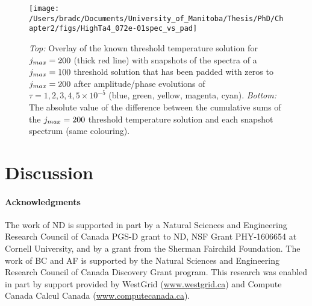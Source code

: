 \documentclass[../PhD.tex]{subfiles}
\begin{document}
\begin{figure}[ht]
	\centering
	\texttt{[image: /Users/bradc/Documents/University\_of\_Manitoba/Thesis/PhD/Chapter2/figs/HighTa4\_072e-01spec\_vs\_pad]}
	\caption{{\it Top:} Overlay of the known threshold temperature solution for $j_{max} = 200$ (thick red line) with snapshots of the spectra of a $j_{max} = 100$ threshold solution that has been padded with zeros to $j_{max} = 200$ after amplitude/phase evolutions of $\tau =1, 2, 3, 4, 5 \times 10^{-5}$ (blue, green, yellow, magenta, cyan). {\it Bottom:} The absolute value of the difference between the cumulative sums of the $j_{max} = 200$ threshold temperature solution and each snapshot spectrum (same colouring).}
	\label{fig: HighTa4_072e-01spec_vs_pad}
\end{figure}


\section{Discussion}
\label{sec: discussion}


\paragraph*{Acknowledgments} The work of ND is supported in part by a Natural Sciences and Engineering
Research Council of Canada PGS-D grant to ND, NSF Grant PHY-1606654
at Cornell University, and by a grant from the Sherman
Fairchild Foundation.
The work of BC and AF is supported by the Natural Sciences
and Engineering Research Council of Canada Discovery Grant program.
This research was enabled in part by support provided by WestGrid
(\href{www.westgrid.ca}{www.westgrid.ca}) and Compute Canada Calcul Canada (\href{www.computecanada.ca}{www.computecanada.ca}).

\end{document}

